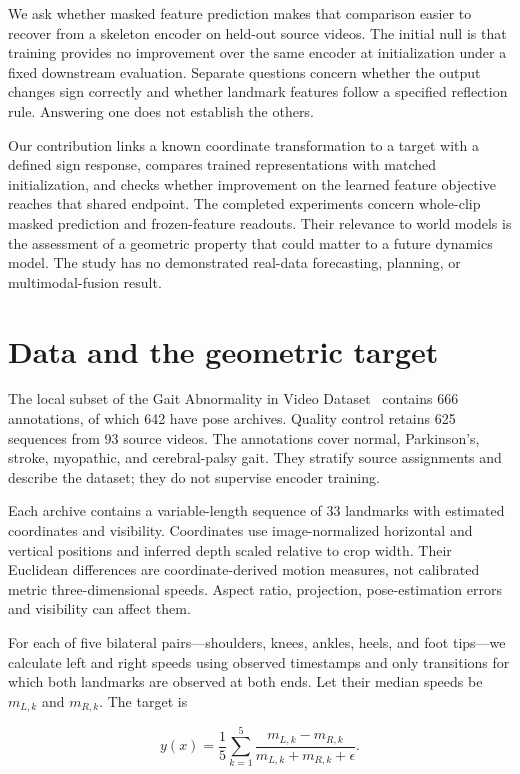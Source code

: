 \documentclass{article}
\begin{document}
We ask whether masked feature prediction makes that comparison easier to recover from a skeleton encoder on held-out source videos. The initial null is that training provides no improvement over the same encoder at initialization under a fixed downstream evaluation. Separate questions concern whether the output changes sign correctly and whether landmark features follow a specified reflection rule. Answering one does not establish the others.

Our contribution links a known coordinate transformation to a target with a defined sign response, compares trained representations with matched initialization, and checks whether improvement on the learned feature objective reaches that shared endpoint. The completed experiments concern whole-clip masked prediction and frozen-feature readouts. Their relevance to world models is the assessment of a geometric property that could matter to a future dynamics model. The study has no demonstrated real-data forecasting, planning, or multimodal-fusion result.

\section{Data and the geometric target}\label{data-and-the-geometric-target}

The local subset of the Gait Abnormality in Video Dataset~\citep{ref06} contains 666 annotations, of which 642 have pose archives. Quality control retains 625 sequences from 93 source videos. The annotations cover normal, Parkinson's, stroke, myopathic, and cerebral-palsy gait. They stratify source assignments and describe the dataset; they do not supervise encoder training.

Each archive contains a variable-length sequence of 33 landmarks with estimated coordinates and visibility. Coordinates use image-normalized horizontal and vertical positions and inferred depth scaled relative to crop width. Their Euclidean differences are coordinate-derived motion measures, not calibrated metric three-dimensional speeds. Aspect ratio, projection, pose-estimation errors and visibility can affect them.

For each of five bilateral pairs---shoulders, knees, ankles, heels, and foot tips---we calculate left and right speeds using observed timestamps and only transitions for which both landmarks are observed at both ends. Let their median speeds be \(m_{L,k}\) and \(m_{R,k}\). The target is

\[
y(x)=\frac{1}{5}\sum_{k=1}^{5}
\frac{m_{L,k}-m_{R,k}}{m_{L,k}+m_{R,k}+\epsilon}.
\]
\end{document}
